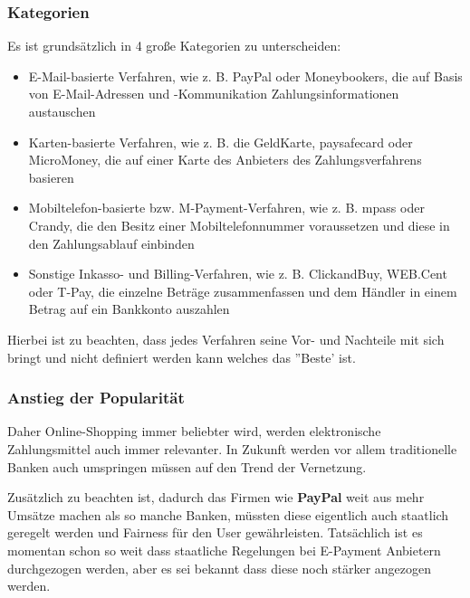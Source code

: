 \subsubsection{Kategorien}
Es ist grundsätzlich in 4 große Kategorien zu unterscheiden:

\begin{itemize}
	\item E-Mail-basierte Verfahren, wie z. B. PayPal oder Moneybookers, die auf Basis von E-Mail-Adressen und -Kommunikation Zahlungsinformationen austauschen
	\item Karten-basierte Verfahren, wie z. B. die GeldKarte, paysafecard oder MicroMoney, die auf einer Karte des Anbieters des Zahlungsverfahrens basieren
	\item Mobiltelefon-basierte bzw. M-Payment-Verfahren, wie z. B. mpass oder Crandy, die den Besitz einer Mobiltelefonnummer voraussetzen und diese in den Zahlungsablauf einbinden
	\item Sonstige Inkasso- und Billing-Verfahren, wie z. B. ClickandBuy, WEB.Cent oder T-Pay, die einzelne Beträge zusammenfassen und dem Händler in einem Betrag auf ein Bankkonto auszahlen
\end{itemize}

Hierbei ist zu beachten, dass jedes Verfahren seine Vor- und Nachteile mit sich bringt und nicht definiert werden kann welches das ''Beste' ist. 

\subsubsection{Anstieg der Popularität}
Daher Online-Shopping immer beliebter wird, werden elektronische Zahlungsmittel auch immer relevanter. In Zukunft werden vor allem traditionelle Banken auch umspringen müssen auf den Trend der Vernetzung.

Zusätzlich zu beachten ist, dadurch das Firmen wie \textbf{PayPal} weit aus mehr Umsätze machen als so manche Banken, müssten diese eigentlich auch staatlich geregelt werden und Fairness für den User gewährleisten. Tatsächlich ist es momentan schon so weit dass staatliche Regelungen bei E-Payment Anbietern durchgezogen werden, aber es sei bekannt dass diese noch stärker angezogen werden.

 
